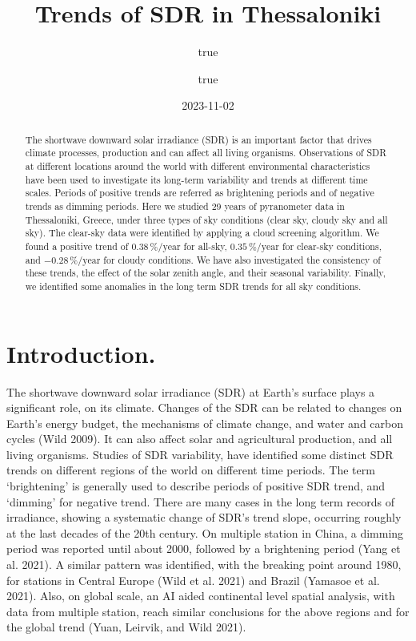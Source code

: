 \documentclass[
  preprint, 3p, authoryear]{article}
\title{Trends of SDR in Thessaloniki}
\author{true \and true}
\date{2023-11-02}
\begin{document}
\maketitle
\begin{abstract}
The shortwave downward solar irradiance (SDR) is an important factor that drives climate processes, production and can affect all living organisms.
Observations of SDR at different locations around the world with different environmental characteristics have been used to investigate its long-term variability and trends at different time scales.
Periods of positive trends are referred as brightening periods and of negative trends as dimming periods.
Here we studied 29 years of pyranometer data in Thessaloniki, Greece, under three types of sky conditions (clear sky, cloudy sky and all sky).
The clear-sky data were identified by applying a cloud screening algorithm. We found a positive trend of \(0.38\,\%/\text{year}\) for all-sky, \(0.35\,\%/\text{year}\) for clear-sky conditions, and \(-0.28\,\%/\text{year}\) for cloudy conditions.
We have also investigated the consistency of these trends, the effect of the solar zenith angle, and their seasonal variability.
Finally, we identified some anomalies in the long term SDR trends for all sky conditions.
\end{abstract}

\hypertarget{introduction.}{%
\section{Introduction.}\label{introduction.}}

The shortwave downward solar irradiance (SDR) at Earth's surface plays a significant role, on its climate.
Changes of the SDR can be related to changes on Earth's energy budget, the mechanisms of climate change, and water and carbon cycles (Wild 2009).
It can also affect solar and agricultural production, and all living organisms.
Studies of SDR variability, have identified some distinct SDR trends on different regions of the world on different time periods.
The term `brightening' is generally used to describe periods of positive SDR trend, and `dimming' for negative trend.
There are many cases in the long term records of irradiance, showing a systematic change of SDR's trend slope, occurring roughly at the last decades of the 20th century.
On multiple station in China, a dimming period was reported until about 2000, followed by a brightening period (Yang et al. 2021).
A similar pattern was identified, with the breaking point around 1980, for stations in Central Europe (Wild et al. 2021) and Brazil (Yamasoe et al. 2021).
Also, on global scale, an AI aided continental level spatial analysis, with data from multiple station, reach similar conclusions for the above regions and for the global trend (Yuan, Leirvik, and Wild 2021).
\end{document}
